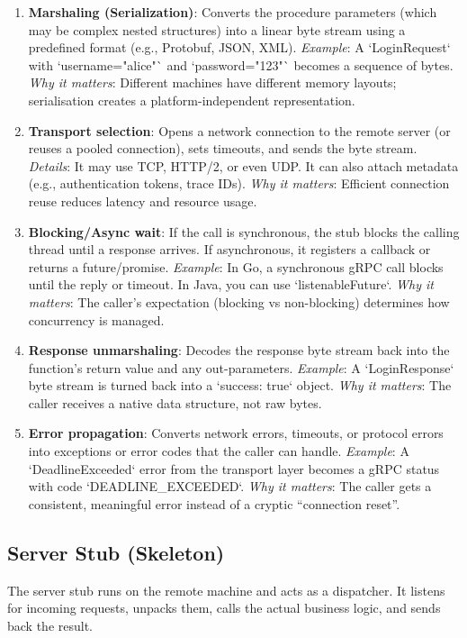 \documentclass[10pt,a4paper]{article}
\begin{document}
\begin{enumerate}
    \item \textbf{Marshaling (Serialization)}: Converts the procedure parameters (which may be complex nested structures) into a linear byte stream using a predefined format (e.g., Protobuf, JSON, XML).  
        \textit{Example}: A `LoginRequest` with `username="alice"` and `password="123"` becomes a sequence of bytes.  
        \textit{Why it matters}: Different machines have different memory layouts; serialisation creates a platform-independent representation.

    \item \textbf{Transport selection}: Opens a network connection to the remote server (or reuses a pooled connection), sets timeouts, and sends the byte stream.  
        \textit{Details}: It may use TCP, HTTP/2, or even UDP. It can also attach metadata (e.g., authentication tokens, trace IDs).  
        \textit{Why it matters}: Efficient connection reuse reduces latency and resource usage.

    \item \textbf{Blocking/Async wait}: If the call is synchronous, the stub blocks the calling thread until a response arrives. If asynchronous, it registers a callback or returns a future/promise.  
        \textit{Example}: In Go, a synchronous gRPC call blocks until the reply or timeout. In Java, you can use `listenableFuture`.  
        \textit{Why it matters}: The caller’s expectation (blocking vs non-blocking) determines how concurrency is managed.

    \item \textbf{Response unmarshaling}: Decodes the response byte stream back into the function’s return value and any out-parameters.  
        \textit{Example}: A `LoginResponse` byte stream is turned back into a `{success: true}` object.  
        \textit{Why it matters}: The caller receives a native data structure, not raw bytes.

    \item \textbf{Error propagation}: Converts network errors, timeouts, or protocol errors into exceptions or error codes that the caller can handle.  
        \textit{Example}: A `DeadlineExceeded` error from the transport layer becomes a gRPC status with code `DEADLINE\_EXCEEDED`.  
        \textit{Why it matters}: The caller gets a consistent, meaningful error instead of a cryptic “connection reset”.
\end{enumerate}

\subsection{Server Stub (Skeleton)}
The server stub runs on the remote machine and acts as a dispatcher. It listens for incoming requests, unpacks them, calls the actual business logic, and sends back the result.
\end{document}
